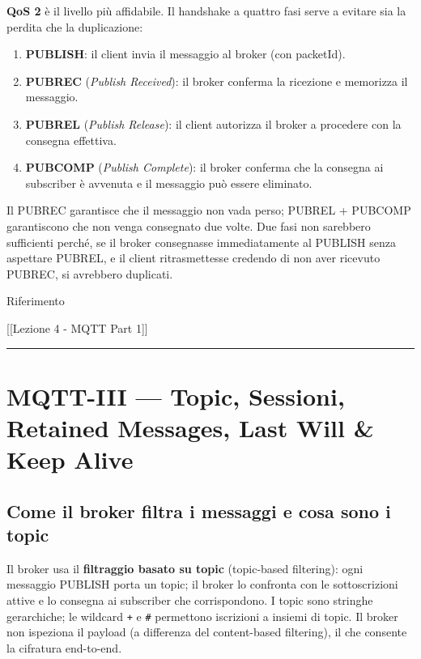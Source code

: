 \documentclass[
  italian,
  openany]{book}
\providecommand{\tightlist}{%
  \setlength{\itemsep}{0pt}\setlength{\parskip}{0pt}}
\begin{document}
\textbf{QoS 2} è il livello più affidabile. Il handshake a quattro fasi
serve a evitare sia la perdita che la duplicazione:

\begin{enumerate}
\def\labelenumi{\arabic{enumi}.}
\tightlist
\item
  \textbf{PUBLISH}: il client invia il messaggio al broker (con
  packetId).
\item
  \textbf{PUBREC} (\emph{Publish Received}): il broker conferma la
  ricezione e memorizza il messaggio.
\item
  \textbf{PUBREL} (\emph{Publish Release}): il client autorizza il
  broker a procedere con la consegna effettiva.
\item
  \textbf{PUBCOMP} (\emph{Publish Complete}): il broker conferma che la
  consegna ai subscriber è avvenuta e il messaggio può essere eliminato.
\end{enumerate}

Il PUBREC garantisce che il messaggio non vada perso; PUBREL + PUBCOMP
garantiscono che non venga consegnato due volte. Due fasi non sarebbero
sufficienti perché, se il broker consegnasse immediatamente al PUBLISH
senza aspettare PUBREL, e il client ritrasmettesse credendo di non aver
ricevuto PUBREC, si avrebbero duplicati.

\begin{calloutnote}{Riferimento}

{[}{[}Lezione 4 - MQTT Part 1{]}{]}

\end{calloutnote}

\begin{center}\rule{0.5\linewidth}{0.5pt}\end{center}

\section{MQTT-III --- Topic, Sessioni, Retained Messages, Last Will \&
Keep
Alive}\label{mqtt-iii-topic-sessioni-retained-messages-last-will-keep-alive}

\subsection{Come il broker filtra i messaggi e cosa sono i
topic}\label{come-il-broker-filtra-i-messaggi-e-cosa-sono-i-topic}

Il broker usa il \textbf{filtraggio basato su topic} (topic-based
filtering): ogni messaggio PUBLISH porta un topic; il broker lo
confronta con le sottoscrizioni attive e lo consegna ai subscriber che
corrispondono. I topic sono stringhe gerarchiche; le wildcard \texttt{+}
e \texttt{\#} permettono iscrizioni a insiemi di topic. Il broker non
ispeziona il payload (a differenza del content-based filtering), il che
consente la cifratura end-to-end.
\end{document}
